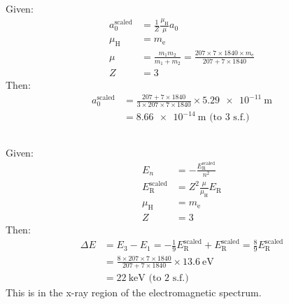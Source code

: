 \subsection{}
Given:
\begin{align*}
    a_0^{\textrm{scaled}} & = \frac{1}{Z} \frac{\mu_\textrm{H}}{\mu} a_0\\
    \mu_\textrm{H} & = m_\textrm{e}\\
    \mu & = \frac{m_1 m_2}{m_1 + m_2} = \frac{207 \times 7 \times 1840 \times m_\textrm{e}}{207 + 7 \times 1840}\\
    Z & = 3
\end{align*}
Then:
\begin{align*}
    a_0^{\textrm{scaled}} & = \frac{207 + 7 \times 1840}{3 \times 207 \times 7 \times 1840} \times \SI{5.29e-11}{\metre}\\
    & = \SI{8.66e-14}{\metre} \textrm{ (to 3 s.f.)}
\end{align*}

\subsection{}
Given:
\begin{align*}
    E_n & = - \frac{E_{\textrm{R}}^{\textrm{scaled}}}{n^2}\\
    E_{\textrm{R}}^{\textrm{scaled}} & = Z^2 \frac{\mu}{\mu_{\textrm{H}}} E_{\textrm{R}}\\
    \mu_\textrm{H} & = m_\textrm{e}\\
    Z & = 3
\end{align*}
Then:
\begin{align*}
    \Delta E & = E_3 - E_1 = - \frac{1}{9} E_{\textrm{R}}^{\textrm{scaled}} + E_{\textrm{R}}^{\textrm{scaled}} = \frac{8}{9} E_{\textrm{R}}^{\textrm{scaled}}\\
    & = \frac{8 \times 207 \times 7 \times 1840}{207 + 7 \times 1840} \times \SI{13.6}{\electronvolt}\\
    & = \SI{22}{\kilo\electronvolt} \textrm{ (to 2 s.f.)}
\end{align*}
This is in the x-ray region of the electromagnetic spectrum.
